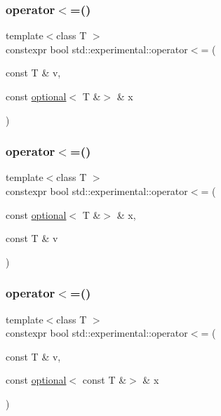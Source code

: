\mbox{\label{namespacestd_1_1experimental_a59ad44110fa8b750e2ca4cf69327c182}} 
\subsubsection{\texorpdfstring{operator$<$=()}{operator<=()}\hspace{0.1cm}{\footnotesize\ttfamily [6/9]}}
{\footnotesize\ttfamily template$<$class T $>$ \\
constexpr bool std\+::experimental\+::operator$<$= (\begin{DoxyParamCaption}\item[{const T \&}]{v,  }\item[{const \hyperlink{classstd_1_1experimental_1_1optional}{optional}$<$ T \&$>$ \&}]{x }\end{DoxyParamCaption})}

\mbox{\label{namespacestd_1_1experimental_adeee1539a6ebda9088aaaa92a363a38c}} 
\subsubsection{\texorpdfstring{operator$<$=()}{operator<=()}\hspace{0.1cm}{\footnotesize\ttfamily [7/9]}}
{\footnotesize\ttfamily template$<$class T $>$ \\
constexpr bool std\+::experimental\+::operator$<$= (\begin{DoxyParamCaption}\item[{const \hyperlink{classstd_1_1experimental_1_1optional}{optional}$<$ T \&$>$ \&}]{x,  }\item[{const T \&}]{v }\end{DoxyParamCaption})}

\mbox{\label{namespacestd_1_1experimental_aca22cd45974dad371a24b9618f2d1b33}} 
\subsubsection{\texorpdfstring{operator$<$=()}{operator<=()}\hspace{0.1cm}{\footnotesize\ttfamily [8/9]}}
{\footnotesize\ttfamily template$<$class T $>$ \\
constexpr bool std\+::experimental\+::operator$<$= (\begin{DoxyParamCaption}\item[{const T \&}]{v,  }\item[{const \hyperlink{classstd_1_1experimental_1_1optional}{optional}$<$ const T \&$>$ \&}]{x }\end{DoxyParamCaption})}

